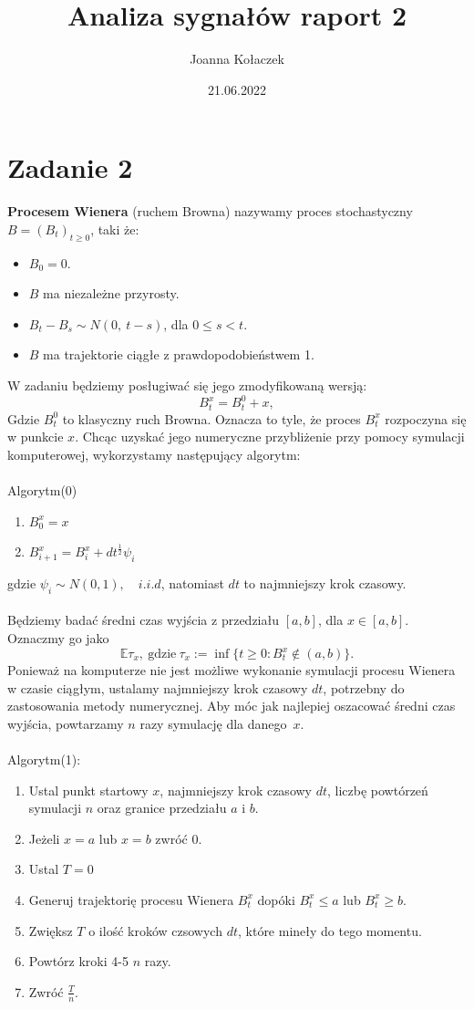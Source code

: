 \documentclass{article}
\title{Analiza sygnałów raport 2}
\author{Joanna Kołaczek}
\date{21.06.2022}
\theoremstyle{break}
\begin{document}
\section*{Zadanie 2}
\textbf{Procesem Wienera} (ruchem Browna) nazywamy proces stochastyczny $B = (B_t)_{t\geq0}$, taki że:
\begin{itemize}
	\item $B_0=0$.
	\item $B$ ma niezależne przyrosty.
	\item $B_t-B_s\sim N(0,~t-s)$, dla $0\leq s<t$.
	\item $B$ ma trajektorie ciągłe z prawdopodobieństwem 1.
\end{itemize}
W zadaniu będziemy posługiwać się jego zmodyfikowaną wersją:
$$B_t^x=B_t^0+x,$$
Gdzie $B_t^0$ to klasyczny ruch Browna. Oznacza to tyle, że proces $B_t^x$ rozpoczyna się w punkcie $x$. Chcąc uzyskać jego numeryczne przybliżenie przy pomocy symulacji komputerowej, wykorzystamy następujący algorytm:
\\ \\
Algorytm(0)
\begin{enumerate}
	\item $B_0^x=x$
	\item $B_{i+1}^x=B_{i}^x+dt^{\frac{1}{2}}\psi_i$
\end{enumerate}
gdzie $\psi_i\sim N(0,1),\quad i.i.d$, natomiast $dt$ to najmniejszy krok czasowy.\\ \\ 
Będziemy badać średni czas wyjścia z  przedziału $[a,b]$, dla $x\in[a,b]$. Oznaczmy go jako $$\mathbb{E}\tau_x \mathrm{,~gdzie~}\tau_x:=\inf\{t\geq0:B_t^x\notin(a,b)\}.$$ 
Ponieważ na komputerze nie jest możliwe wykonanie symulacji procesu Wienera w czasie ciągłym, ustalamy najmniejszy krok czasowy $dt$, potrzebny do zastosowania metody numerycznej. Aby móc jak najlepiej oszacować średni czas wyjścia, powtarzamy $n$ razy symulację dla danego~$x$.\\ \\
Algorytm(1):
\begin{enumerate}
	\item Ustal punkt startowy $x$, najmniejszy krok czasowy $dt$, liczbę powtórzeń symulacji $n$ oraz granice przedziału $a$ i $b$.
	\item Jeżeli $x=a$ lub $x=b$ zwróć 0.
	\item Ustal $T=0$ 
	\item Generuj trajektorię procesu Wienera $B_t^x$ dopóki $B_t^x\leq a$ lub $B_t^x\geq b$.
	\item Zwiększ $T$ o ilość kroków czsowych $dt$, które mineły do tego momentu.
	\item Powtórz kroki 4-5 $n$ razy.
	\item Zwróć $\frac{T}{n}$.
\end{enumerate}
\end{document}
